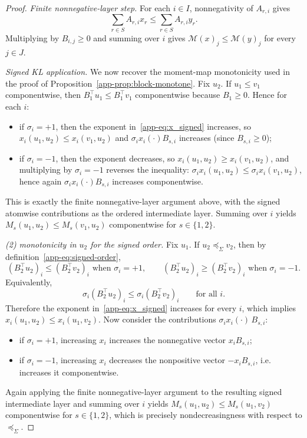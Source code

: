 \documentclass{article}
\theoremstyle{plain}
\begin{document}
\begin{proof}
\noindent\textit{Finite nonnegative-layer step.}
For each $i\in I$, nonnegativity of $A_{r,i}$ gives
\[
  \sum_{r\in S}A_{r,i}x_r\le \sum_{r\in S}A_{r,i}y_r .
\]
Multiplying by $B_{i,j}\ge0$ and summing over $i$ gives
$\mathcal M(x)_j\le\mathcal M(y)_j$ for every $j\in J$.

\noindent\textit{Signed KL application.}
We now recover the moment-map monotonicity used in the proof of
Proposition~\ref{app-prop:block-monotone}. Fix $u_2$. If $u_1\le v_1$
componentwise, then $B_1^\top u_1\le B_1^\top v_1$ componentwise because
$B_1\ge 0$. Hence for each $i$:
\begin{itemize}[leftmargin=2em,itemsep=0.2em]
\item if $\sigma_i=+1$, then the exponent in~\eqref{app-eq:x_signed} increases, so $x_i(u_1,u_2)\le x_i(v_1,u_2)$ and
$\sigma_i x_i(\cdot) B_{s,i}$ increases (since $B_{s,i}\ge 0$);
\item if $\sigma_i=-1$, then the exponent decreases, so $x_i(u_1,u_2)\ge x_i(v_1,u_2)$, and multiplying by $\sigma_i=-1$
reverses the inequality: $\sigma_i x_i(u_1,u_2)\le \sigma_i x_i(v_1,u_2)$, hence again
$\sigma_i x_i(\cdot) B_{s,i}$ increases componentwise.
\end{itemize}
This is exactly the finite nonnegative-layer argument above, with the signed
atomwise contributions as the ordered intermediate layer. Summing over $i$
yields $M_s(u_1,u_2)\le M_s(v_1,u_2)$ componentwise for $s\in\{1,2\}$.

\noindent\textit{(2) monotonicity in $u_2$ for the signed order.}
Fix $u_1$. If $u_2\preceq_\Sigma v_2$, then by definition~\eqref{app-eq:signed-order},
\[
(B_2^\top u_2)_i \le (B_2^\top v_2)_i \text{ when }\sigma_i=+1,
\qquad
(B_2^\top u_2)_i \ge (B_2^\top v_2)_i \text{ when }\sigma_i=-1.
\]
Equivalently,
\[
\sigma_i (B_2^\top u_2)_i \le \sigma_i (B_2^\top v_2)_i\qquad \text{for all }i.
\]
Therefore the exponent in~\eqref{app-eq:x_signed} increases for every $i$, which implies $x_i(u_1,u_2)\le x_i(u_1,v_2)$.
Now consider the contributions $\sigma_i x_i(\cdot)\,B_{s,i}$:
\begin{itemize}[leftmargin=2em,itemsep=0.2em]
\item if $\sigma_i=+1$, increasing $x_i$ increases the nonnegative vector $x_i B_{s,i}$;
\item if $\sigma_i=-1$, increasing $x_i$ decreases the nonpositive vector $-x_i B_{s,i}$, i.e. increases it componentwise.
\end{itemize}
Again applying the finite nonnegative-layer argument to the resulting signed
intermediate layer and summing over $i$ yields
$M_s(u_1,u_2)\le M_s(u_1,v_2)$ componentwise for $s\in\{1,2\}$, which is
precisely nondecreasingness with respect to $\preceq_\Sigma$.
\end{proof}
\end{document}
